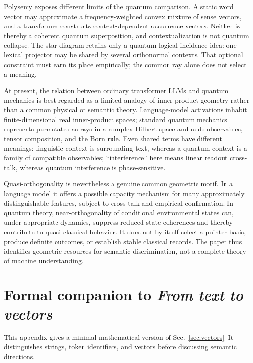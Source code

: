\documentclass[
  aps,
  reprint,
  superscriptaddress,
  floatfix,
  nofootinbib,
  longbibliography
]{revtex4-2}
\begin{document}
Polysemy exposes different limits of the quantum comparison.  A static word
vector may approximate a frequency-weighted convex mixture of sense vectors,
and a transformer constructs context-dependent occurrence vectors.  Neither
is thereby a coherent quantum superposition, and contextualization is not
quantum collapse.
The star diagram retains only a quantum-logical incidence idea: one lexical
projector may be shared by several orthonormal contexts.  That optional
constraint must earn its place empirically; the common ray alone does not
select a meaning.

At present, the relation between ordinary transformer LLMs and quantum mechanics
is best regarded as a limited analogy of inner-product geometry rather than a
common physical or semantic theory.  Language-model activations inhabit
finite-dimensional real inner-product spaces; standard quantum mechanics
represents pure states as rays in a complex Hilbert space and adds observables,
tensor composition, and the Born rule.  Even shared terms have different
meanings: linguistic context is surrounding text, whereas a quantum context is
a family of compatible observables; ``interference'' here means linear readout
cross-talk, whereas quantum interference is phase-sensitive.

Quasi-orthogonality is nevertheless a genuine common geometric motif.  In a
language model it offers a possible capacity mechanism for many approximately
distinguishable features, subject to cross-talk and empirical confirmation.
In quantum theory, near-orthogonality of conditional environmental states can,
under appropriate dynamics, suppress reduced-state coherences and thereby
contribute to quasi-classical behavior.  It does not by itself select a pointer
basis, produce definite outcomes, or establish stable classical records.  The
paper thus identifies geometric resources for semantic discrimination, not a
complete theory of machine understanding.

\appendix

\section{Formal companion to \emph{From text to vectors}}
\label{app:vectors}

This appendix gives a minimal mathematical version of
Sec.~\ref{sec:vectors}.  It distinguishes strings, token identifiers, and
vectors before discussing semantic directions.
\end{document}
